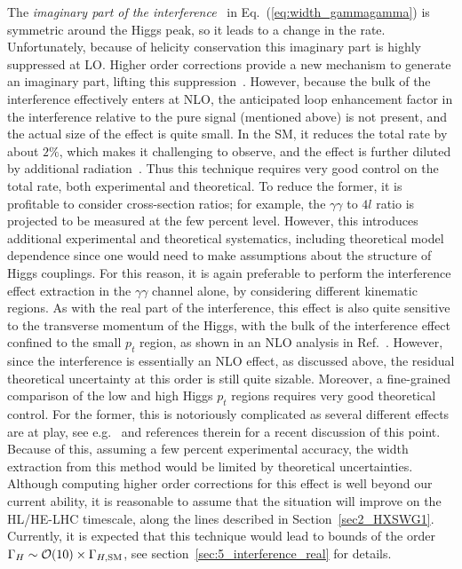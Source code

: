 The \emph{imaginary part of the interference}~\cite{Dixon:2013haa,Campbell:2017rke} 
in Eq.~(\ref{eq:width_gammagamma})
is symmetric around the Higgs peak, so it leads to a change in the rate. Unfortunately,
because of helicity conservation this imaginary part is highly suppressed at LO.
Higher order corrections provide a new mechanism to generate an imaginary part, lifting this suppression~\cite{Dixon:2013haa}.
However, because the bulk of the interference effectively enters at NLO,
the anticipated loop enhancement factor in the interference relative to the pure signal (mentioned above)
is not present, and the actual size of the effect is quite small. In the SM, 
it reduces the total rate by
about $2\%$, 
which makes it challenging to observe, and the effect is further diluted 
by additional radiation~\cite{Campbell:2017rke}. Thus this technique requires very good
control on the total rate, both experimental and theoretical. To reduce the former, it is 
profitable to consider cross-section ratios; for example, the $\gamma\gamma$ to $4l$ ratio
is projected to be measured at the few percent level.
However, this introduces additional experimental and theoretical systematics, including 
theoretical model dependence since one would need to make assumptions about the structure of Higgs 
couplings.
For this reason, it is again preferable to perform the interference effect extraction in 
the $\gamma\gamma$ channel alone,
by considering different kinematic regions.
%
As with the real part of the interference,  this effect is also quite sensitive to the transverse momentum of the Higgs, with the bulk of the interference effect confined to the small $p_t$ region, as shown in an NLO analysis in Ref.~\cite{Campbell:2017rke}. However, since the interference is essentially an NLO effect, as discussed above,  the residual theoretical uncertainty at this order is still quite sizable. Moreover, a fine-grained comparison of the low and high 
Higgs $p_t$ regions requires very good theoretical control. For the former, this is notoriously
complicated as several different effects are at play, see e.g.~\cite{Caola:2018zye} and references 
therein for a recent discussion of this point. Because of this, 
assuming a few percent experimental accuracy, the width extraction from this method would be
limited by theoretical uncertainties. Although computing higher order corrections for this
effect is well beyond our current ability, it is reasonable to assume that the situation
will improve on the HL/HE-LHC timescale, along the lines described in Section~\ref{sec2_HXSWG1}.
Currently, it is expected that this technique would lead to bounds of the order
${\Gamma_H} \sim \mathcal O(10)\times {\Gamma_{H,{\rm SM}}}$, see section~\ref{sec:5_interference_real} for details. 

